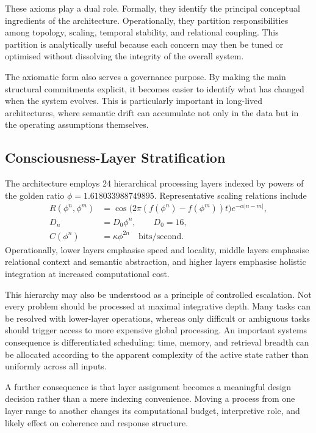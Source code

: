 \documentclass[12pt]{article}
\begin{document}
These axioms play a dual role. Formally, they identify the principal conceptual ingredients of the architecture. Operationally, they partition responsibilities among topology, scaling, temporal stability, and relational coupling. This partition is analytically useful because each concern may then be tuned or optimised without dissolving the integrity of the overall system.

The axiomatic form also serves a governance purpose. By making the main structural commitments explicit, it becomes easier to identify what has changed when the system evolves. This is particularly important in long-lived architectures, where semantic drift can accumulate not only in the data but in the operating assumptions themselves.

\subsection{Consciousness-Layer Stratification}
The architecture employs 24 hierarchical processing layers indexed by powers of the golden ratio $\phi = 1.618033988749895$. Representative scaling relations include
\begin{align}
R(\phi^n,\phi^m) &= \cos\bigl(2\pi(f(\phi^n)-f(\phi^m))t\bigr)e^{-\alpha|n-m|},\\
D_n &= D_0\phi^n, \qquad D_0 = 16,\\
C(\phi^n) &= \kappa\phi^{2n} \quad \text{bits/second}.
\end{align}
Operationally, lower layers emphasise speed and locality, middle layers emphasise relational context and semantic abstraction, and higher layers emphasise holistic integration at increased computational cost.

This hierarchy may also be understood as a principle of controlled escalation. Not every problem should be processed at maximal integrative depth. Many tasks can be resolved with lower-layer operations, whereas only difficult or ambiguous tasks should trigger access to more expensive global processing. An important systems consequence is differentiated scheduling: time, memory, and retrieval breadth can be allocated according to the apparent complexity of the active state rather than uniformly across all inputs.

A further consequence is that layer assignment becomes a meaningful design decision rather than a mere indexing convenience. Moving a process from one layer range to another changes its computational budget, interpretive role, and likely effect on coherence and response structure.
\end{document}
